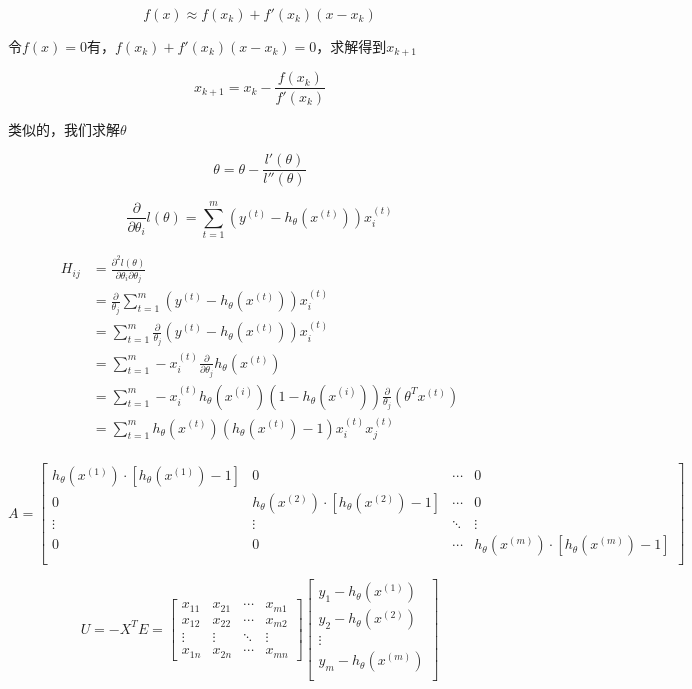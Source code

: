 \documentclass{ML}
\begin{document}
$$f(x) \approx f(x_k) + f'(x_k)(x-x_k)$$

令$f(x)=0$有，$f(x_k)+f′(x_k)(x−x_k)=0$，求解得到$x_{k+1}$

$$x_{k+1}=x_{k}-\frac{f(x_k)}{f'(x_k)}$$

类似的，我们求解$\theta$

$$\theta = \theta - \frac{l'(\theta)}{l''(\theta)}$$

$$\frac{\partial }{\partial\theta_i}l(\theta)=\sum_{t=1}^m(y^{(t)}-h_\theta(x^{(t)}))x_i^{(t)}$$

$$\begin{array}{ll}
		H_{ij}
		 & =\frac{\partial^2l(\theta)}{\partial \theta_i\partial \theta_j}                                               \\
		 & =\frac{\partial }{\theta_j}\sum_{t=1}^m(y^{(t)}-h_\theta(x^{(t)}))x_i^{(t)}                                   \\
		 & =\sum_{t=1}^m \frac{\partial }{\theta_j} (y^{(t)}-h_\theta(x^{(t)}))x_i^{(t)}                                 \\
		 & =\sum_{t=1}^m -x_i^{(t)} \frac{\partial}{\partial\theta_j}h_\theta(x^{(t)})                                   \\
		 & =\sum_{t=1}^m -x_i^{(t)} h_\theta(x^{(i)}) (1-h_\theta(x^{(i)})) \frac{\partial }{\theta_j}(\theta^Tx^{(t)} ) \\
		 & =\sum_{t=1}^m h_\theta(x^{(t)})(h_\theta(x^{(t)})-1)x^{(t)}_ix^{(t)}_j                                        \\
	\end{array}$$

$$A=\begin{bmatrix}
		h_θ(x^{(1)})\cdot [h_θ(x^{(1)})-1] & 0                                  & \cdots & 0                                  \\
		0                                  & h_θ(x^{(2)})\cdot [h_θ(x^{(2)})-1] & \cdots & 0                                  \\
		\vdots                             & \vdots                             & \ddots & \vdots                             \\
		0                                  & 0                                  & \cdots & h_θ(x^{(m)})\cdot [h_θ(x^{(m)})-1] \\
	\end{bmatrix}$$

$$U = - X^T E=  \begin{bmatrix}
		x_{11} & x_{21} & \cdots & x_{m1} \\
		x_{12} & x_{22} & \cdots & x_{m2} \\
		\vdots & \vdots & \ddots & \vdots \\
		x_{1n} & x_{2n} & \cdots & x_{mn}
	\end{bmatrix}
	\begin{bmatrix}
		y_1 - h_θ(x^{(1)}) \\
		y_2 - h_θ(x^{(2)}) \\
		\vdots             \\
		y_m - h_θ(x^{(m)}) \\
	\end{bmatrix}$$
\end{document}
